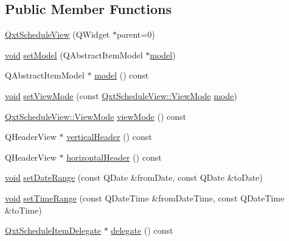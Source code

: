 \subsection*{Public Member Functions}
\begin{DoxyCompactItemize}
\item 
\hyperlink{class_qxt_schedule_view_a6f33a00a5bc76b2cb94ee351379b85c6}{Qxt\-Schedule\-View} (Q\-Widget $\ast$parent=0)
\item 
\hyperlink{group___u_a_v_objects_plugin_ga444cf2ff3f0ecbe028adce838d373f5c}{void} \hyperlink{class_qxt_schedule_view_a3db99dc584f4e0b6fe1340a6f1ba437c}{set\-Model} (Q\-Abstract\-Item\-Model $\ast$\hyperlink{class_qxt_schedule_view_a7490bdcc9b3b8f902436e948ff6c8897}{model})
\item 
Q\-Abstract\-Item\-Model $\ast$ \hyperlink{class_qxt_schedule_view_a7490bdcc9b3b8f902436e948ff6c8897}{model} () const 
\item 
\hyperlink{group___u_a_v_objects_plugin_ga444cf2ff3f0ecbe028adce838d373f5c}{void} \hyperlink{class_qxt_schedule_view_a7fd4cd03ade11c55453870944df1679f}{set\-View\-Mode} (const \hyperlink{class_qxt_schedule_view_ac4a79a5a6631b96d95a4f83e9f873a60}{Qxt\-Schedule\-View\-::\-View\-Mode} \hyperlink{glext_8h_a1e71d9c196e4683cc06c4b54d53f7ef5}{mode})
\item 
\hyperlink{class_qxt_schedule_view_ac4a79a5a6631b96d95a4f83e9f873a60}{Qxt\-Schedule\-View\-::\-View\-Mode} \hyperlink{class_qxt_schedule_view_acafa5cb07f284d74574f83a68a60cee4}{view\-Mode} () const 
\item 
Q\-Header\-View $\ast$ \hyperlink{class_qxt_schedule_view_a3c5eb6d3da3e9c382941406b3ee9fb3b}{vertical\-Header} () const 
\item 
Q\-Header\-View $\ast$ \hyperlink{class_qxt_schedule_view_a83194617414efd5793254c14ec074750}{horizontal\-Header} () const 
\item 
\hyperlink{group___u_a_v_objects_plugin_ga444cf2ff3f0ecbe028adce838d373f5c}{void} \hyperlink{class_qxt_schedule_view_ae05b77c77c53a92b6d57ed138f0359e9}{set\-Date\-Range} (const Q\-Date \&from\-Date, const Q\-Date \&to\-Date)
\item 
\hyperlink{group___u_a_v_objects_plugin_ga444cf2ff3f0ecbe028adce838d373f5c}{void} \hyperlink{class_qxt_schedule_view_a3c21a439e0ce8e9ed492ff9d1865377f}{set\-Time\-Range} (const Q\-Date\-Time \&from\-Date\-Time, const Q\-Date\-Time \&to\-Time)
\item 
\hyperlink{qxtscheduleitemdelegate_8h_a9b8b6fec2a65bed5bb2b496d7178c6e0}{Qxt\-Schedule\-Item\-Delegate} $\ast$ \hyperlink{class_qxt_schedule_view_a5ebc3f4a9bb0bf5ed11ee02f26775bb8}{delegate} () const 

\end{DoxyCompactItemize}
